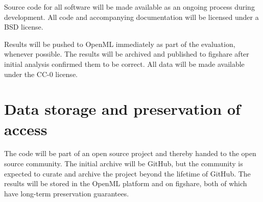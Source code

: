 Source code for all software will be made available as an ongoing process
during development. All code and accompanying documentation will be licensed
under a BSD license.

Results will be pushed to OpenML immediately as part of the evaluation,
whenever possible. The results will be archived and published to figshare after
initial analysis confirmed them to be correct.
All data will be made available under the CC-0 license.

\section{Data storage and preservation of access}

The code will be part of an open source project and thereby handed to the open
source community. The initial archive will be GitHub, but the community is
expected to curate and archive the project beyond the lifetime of GitHub.
The results will be stored in the OpenML platform and on figshare, both of
which have long-term preservation guarantees.

